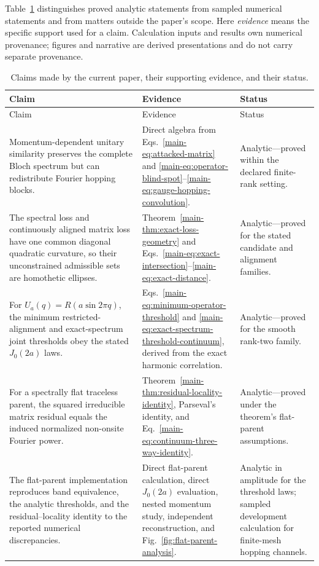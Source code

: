 \documentclass[11pt]{article}
\begin{document}
Table~\ref{tab:claim-evidence-status} distinguishes proved analytic statements from
sampled numerical statements and from matters outside the paper's scope. Here
\emph{evidence} means the specific support used for a claim. Calculation inputs and
results own numerical provenance; figures and narrative are derived presentations and
do not carry separate provenance.

\small
\begin{longtable}{@{}>{\raggedright\arraybackslash}p{}>{\raggedright\arraybackslash}p{}>{\raggedright\arraybackslash}p{}@{}}
\caption{Claims made by the current paper, their supporting evidence, and their status.}
\label{tab:claim-evidence-status}\\
\toprule
Claim & Evidence & Status\\
\midrule
\endfirsthead
\toprule
Claim & Evidence & Status\\
\midrule
\endhead
Momentum-dependent unitary similarity preserves the complete Bloch spectrum but can redistribute Fourier hopping blocks. & Direct algebra from Eqs.~\eqref{main-eq:attacked-matrix} and \eqref{main-eq:operator-blind-spot}--\eqref{main-eq:gauge-hopping-convolution}. & Analytic---proved within the declared finite-rank setting.\\
The spectral loss and continuously aligned matrix loss have one common diagonal quadratic curvature, so their unconstrained admissible sets are homothetic ellipses. & Theorem~\ref{main-thm:exact-loss-geometry} and Eqs.~\eqref{main-eq:exact-intersection}--\eqref{main-eq:exact-distance}. & Analytic---proved for the stated candidate and alignment families.\\
For $U_a(q)=R(a\sin2\pi q)$, the minimum restricted-alignment and exact-spectrum joint thresholds obey the stated $J_0(2a)$ laws. & Eqs.~\eqref{main-eq:minimum-operator-threshold} and \eqref{main-eq:exact-spectrum-threshold-continuum}, derived from the exact harmonic correlation. & Analytic---proved for the smooth rank-two family.\\
For a spectrally flat traceless parent, the squared irreducible matrix residual equals the induced normalized non-onsite Fourier power. & Theorem~\ref{main-thm:residual-locality-identity}, Parseval's identity, and Eq.~\eqref{main-eq:continuum-three-way-identity}. & Analytic---proved under the theorem's flat-parent assumptions.\\
The flat-parent implementation reproduces band equivalence, the analytic thresholds, and the residual--locality identity to the reported numerical discrepancies. & Direct flat-parent calculation, direct $J_0(2a)$ evaluation, nested momentum study, independent reconstruction, and Fig.~\ref{fig:flat-parent-analysis}. & Analytic in amplitude for the threshold laws; sampled development calculation for finite-mesh hopping channels.\\

\end{longtable}
\end{document}
